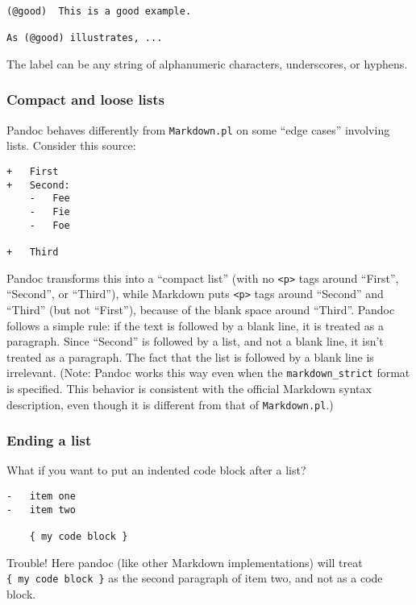 \documentclass[]{article}
\begin{document}
\begin{verbatim}
(@good)  This is a good example.

As (@good) illustrates, ...
\end{verbatim}

The label can be any string of alphanumeric characters, underscores, or
hyphens.

\subsubsection{Compact and loose lists}\label{compact-and-loose-lists}

Pandoc behaves differently from \texttt{Markdown.pl} on some ``edge
cases'' involving lists. Consider this source:

\begin{verbatim}
+   First
+   Second:
    -   Fee
    -   Fie
    -   Foe

+   Third
\end{verbatim}

Pandoc transforms this into a ``compact list'' (with no
\texttt{\textless{}p\textgreater{}} tags around ``First'', ``Second'',
or ``Third''), while Markdown puts \texttt{\textless{}p\textgreater{}}
tags around ``Second'' and ``Third'' (but not ``First''), because of the
blank space around ``Third''. Pandoc follows a simple rule: if the text
is followed by a blank line, it is treated as a paragraph. Since
``Second'' is followed by a list, and not a blank line, it isn't treated
as a paragraph. The fact that the list is followed by a blank line is
irrelevant. (Note: Pandoc works this way even when the
\texttt{markdown\_strict} format is specified. This behavior is
consistent with the official Markdown syntax description, even though it
is different from that of \texttt{Markdown.pl}.)

\subsubsection{Ending a list}\label{ending-a-list}

What if you want to put an indented code block after a list?

\begin{verbatim}
-   item one
-   item two

    { my code block }
\end{verbatim}

Trouble! Here pandoc (like other Markdown implementations) will treat
\texttt{\{\ my\ code\ block\ \}} as the second paragraph of item two,
and not as a code block.
\end{document}
